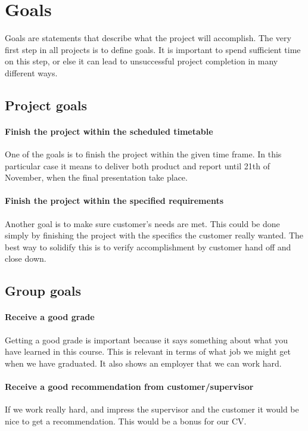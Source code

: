 \section{Goals}
Goals are statements that describe what the project will accomplish. 
The very first step in all projects is to define goals. 
It is important to spend sufficient time on this step, or else it can lead to unsuccessful project completion in many different ways. 
   
\label{sec:project-goals}

\subsection{Project goals}

\paragraph{Finish the project within the scheduled timetable}
One of the goals is to finish the project within the given time frame. 
In this particular case it means to deliver both product and report until 21th of November, when the final presentation take place.

\paragraph{Finish the project within the specified requirements}
Another goal is to make sure customer's needs are met.
This could be done simply by finishing the project with the specifics the customer really wanted. 
The best way to solidify this is to verify accomplishment by customer hand off and close down.

\subsection{Group goals}
\paragraph{Receive a good grade}
Getting a good grade is important because it says something about what you have learned in this course. 
This is relevant in terms of what job we might get when we have graduated. It also shows an employer that we can work hard. 
\paragraph{Receive a good recommendation from customer/supervisor}
If we work really hard, and impress the supervisor and the customer it would be nice to get a recommendation. This would be a bonus for our CV.

